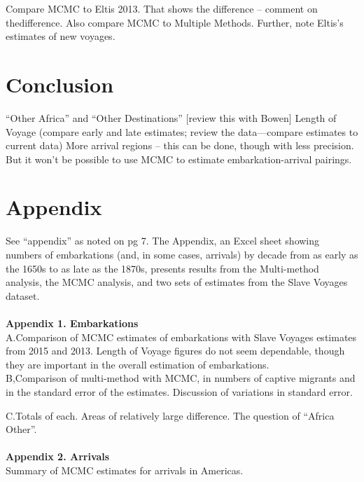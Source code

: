 \documentclass[preprint,12pt]{elsarticle}
\begin{document}
Compare MCMC to Eltis 2013. That shows the difference – comment on thedifference.
Also compare MCMC to Multiple Methods.
Further, note Eltis’s estimates of new voyages.\\

\section{Conclusion}
“Other Africa” and “Other Destinations” [review this with Bowen]
Length of Voyage (compare early and late estimates; review the data—compare estimates to current data)
More arrival regions – this can be done, though with less precision.
But it won’t be possible to use MCMC to estimate embarkation-arrival pairings.\\


\section{Appendix}
See “appendix” as noted on pg 7.
The Appendix, an Excel sheet showing numbers of  embarkations (and, in some cases, arrivals) by decade from as early as the 1650s to as late as the 1870s, presents results from the Multi-method analysis, the MCMC analysis, and two sets of estimates from the Slave Voyages dataset.\\
\\
\textbf{Appendix 1. Embarkations}\\
\indent
A.Comparison of MCMC estimates of embarkations with Slave Voyages estimates from 2015 and 2013. Length of Voyage figures do not seem dependable, though they are important in the overall estimation of embarkations.\\

B,Comparison of multi-method with MCMC, in numbers of captive migrants and in the standard error of the estimates. Discussion of variations in standard error.

C.Totals of each. Areas of relatively large difference. The question of “Africa Other”.\\
\\
\textbf{Appendix 2. Arrivals}\\
\indent
Summary of MCMC estimates for arrivals in Americas.
\end{document}
